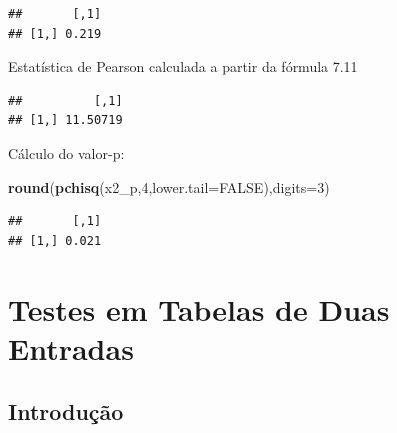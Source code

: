 \documentclass[]{book}
\newenvironment{Shaded}{\begin{snugshade}}{\end{snugshade}}
\newcommand{\KeywordTok}[1]{\textcolor[rgb]{0.13,0.29,0.53}{\textbf{{#1}}}}
\newcommand{\DataTypeTok}[1]{\textcolor[rgb]{0.13,0.29,0.53}{{#1}}}
\newcommand{\DecValTok}[1]{\textcolor[rgb]{0.00,0.00,0.81}{{#1}}}
\newcommand{\OtherTok}[1]{\textcolor[rgb]{0.56,0.35,0.01}{{#1}}}
\newcommand{\NormalTok}[1]{{#1}}
\numberwithin{example}{chapter}
\numberwithin{remark}{chapter}
\numberwithin{definition}{chapter}
\begin{document}
\begin{verbatim}
##       [,1]
## [1,] 0.219
\end{verbatim}

Estatística de Pearson calculada a partir da fórmula 7.11

\begin{Shaded}
\end{Shaded}

\begin{verbatim}
##          [,1]
## [1,] 11.50719
\end{verbatim}

Cálculo do valor-p:

\begin{Shaded}
\begin{Highlighting}[]
\KeywordTok{round}\NormalTok{(}\KeywordTok{pchisq}\NormalTok{(x2_p,}\DecValTok{4}\NormalTok{,}\DataTypeTok{lower.tail=}\OtherTok{FALSE}\NormalTok{),}\DataTypeTok{digits=}\DecValTok{3}\NormalTok{)}
\end{Highlighting}
\end{Shaded}

\begin{verbatim}
##       [,1]
## [1,] 0.021
\end{verbatim}

\chapter{Testes em Tabelas de Duas Entradas}\label{testetab2}

\section{Introdução}\label{introducao-2}
\end{document}

